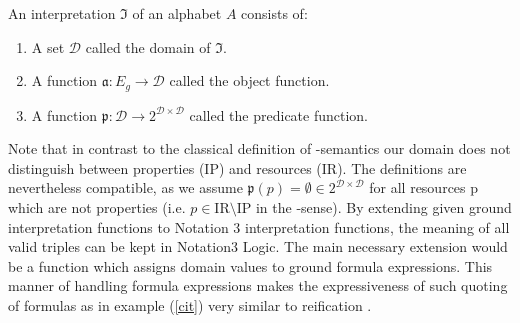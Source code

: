 
\begin{definition}[Interpretation]
An interpretation $\mathfrak{I}$ of
an alphabet $A$ consists of:
\begin{enumerate}
\item A set $\mathcal{D}$ called the domain of $\mathfrak{I}$.
\item A function $\mathfrak{a}: 
E_g \rightarrow \mathcal{D}$ called the object function.
\item A function $\mathfrak{p}:
\mathcal{D} \rightarrow 2^{\mathcal{D} \times \mathcal{D}}$ called the predicate function.
\end{enumerate}
\end{definition}

Note that in contrast to the classical definition of \rdf-semantics \cite{rdf} our domain does not distinguish between properties (IP) 
and resources (IR). 
The definitions are nevertheless compatible, as we assume $\mathfrak{p}(p)=\emptyset\in 2^{\mathcal{D} \times \mathcal{D}}$
for all resources p which are not properties (i.e. $p \in \text{IR}\setminus \text{IP}$ in the \rdf-sense). 
By extending given \rdf ground interpretation functions to Notation 3 interpretation functions, the meaning of all valid \rdf triples can be kept in Notation3 Logic. %
The main necessary extension would be a function which assigns domain values to ground formula expressions. 
This manner of handling formula expressions makes the expressiveness of such quoting of formulas as in example (\ref{cit}) very similar to \rdf reification \cite{rdf}. 


